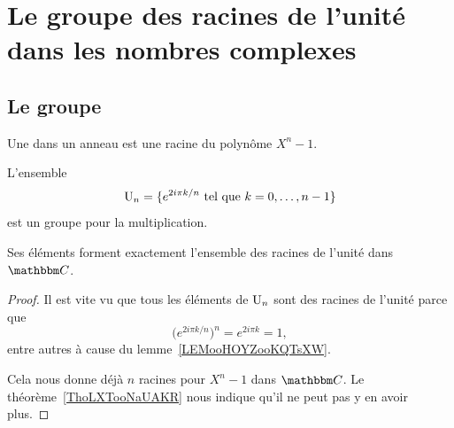 
\section{Le groupe des racines de l'unité dans les nombres complexes}
\label{SecGJOLooWdMYVl}

\subsection{Le groupe}
\label{subSecKGDFooAbETjs}

\begin{definition}
    Une  dans un anneau est une racine du polynôme \( X^n-1\).
\end{definition}

\begin{lemmaDef}        \label{LEMooSXFBooYJmRTK}
    L'ensemble
    \begin{equation}        \label{EqIEAXooIpvFPe}
        \operatorname{U}_n=\{  e^{2i\pi k/n}  \text{ tel que } k=0,\ldots, n-1 \}
    \end{equation}
    est un groupe pour la multiplication.

    Ses éléments forment exactement l'ensemble des racines de l'unité dans \( \eC\).
\end{lemmaDef}

\begin{proof}
    Il est vite vu que tous les éléments de \( \operatorname{U}_n\) sont des racines de l'unité parce que
    \begin{equation}
        \big(  e^{2i\pi k/n} \big)^n= e^{2i\pi k}=1,
    \end{equation}
    entre autres à cause du lemme~\ref{LEMooHOYZooKQTsXW}.

    Cela nous donne déjà \( n\) racines pour \( X^n-1\) dans \( \eC\). Le théorème~\ref{ThoLXTooNaUAKR} nous indique qu'il ne peut pas y en avoir plus.
\end{proof}

